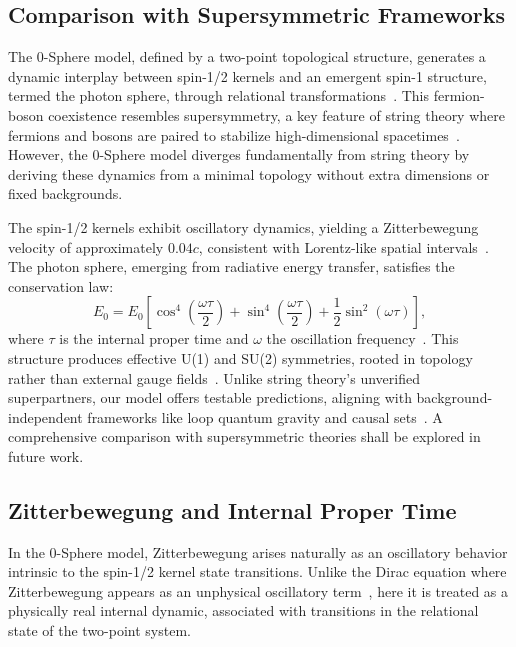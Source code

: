 \documentclass[%
 reprint,
 amsmath,amssymb,
 aps,
]{revtex4-1}
\numberwithin{equation}{section}%
\begin{document}
\subsection{Comparison with Supersymmetric Frameworks}
\label{subsec:supersymmetry}

The 0-Sphere model, defined by a two-point topological structure, generates a dynamic interplay between spin-1/2 kernels and an emergent spin-1 structure, termed the photon sphere, through relational transformations~\cite{hanamura2309.0047, hanamura2506.0072}. This fermion-boson coexistence resembles supersymmetry, a key feature of string theory where fermions and bosons are paired to stabilize high-dimensional spacetimes~\cite{polchinski1998}. However, the 0-Sphere model diverges fundamentally from string theory by deriving these dynamics from a minimal topology without extra dimensions or fixed backgrounds.

The spin-1/2 kernels exhibit oscillatory dynamics, yielding a Zitterbewegung velocity of approximately $0.04c$, consistent with Lorentz-like spatial intervals~\cite{hanamura2309.0047}. The photon sphere, emerging from radiative energy transfer, satisfies the conservation law:
\begin{equation}
E_0 = E_0\left[\cos^4\left(\frac{\omega\tau}{2}\right) + \sin^4\left(\frac{\omega\tau}{2}\right) + \frac{1}{2}\sin^2(\omega\tau)\right],
\end{equation}
where \(\tau\) is the internal proper time and \(\omega\) the oscillation frequency~\cite{hanamura2506.0072}. This structure produces effective U(1) and SU(2) symmetries, rooted in topology rather than external gauge fields~\cite{hanamura2506.0072}. Unlike string theory's unverified superpartners, our model offers testable predictions, aligning with background-independent frameworks like loop quantum gravity and causal sets~\cite{rovelli2004, sorkin2003}. A comprehensive comparison with supersymmetric theories shall be explored in future work.

\subsection{Zitterbewegung and Internal Proper Time}
\label{subsec:zitterbewegung}

In the 0-Sphere model, Zitterbewegung arises naturally as an oscillatory behavior intrinsic to the spin-1/2 kernel state transitions. Unlike the Dirac equation where Zitterbewegung appears as an unphysical oscillatory term~\cite{dirac1928, schrodinger1930}, here it is treated as a physically real internal dynamic, associated with transitions in the relational state of the two-point system.
\end{document}
